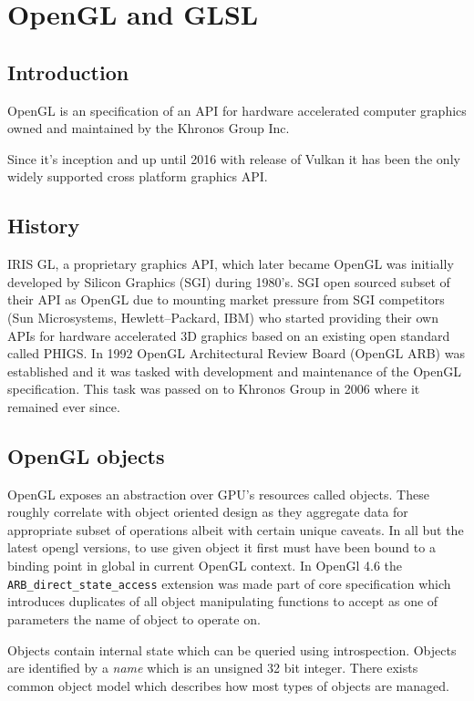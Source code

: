 \chapter{OpenGL and GLSL}

\section{Introduction}

OpenGL is an specification of an API for hardware accelerated computer graphics owned and maintained by the Khronos Group Inc.

Since it's inception  and up until 2016 with release of Vulkan it has been the only widely supported cross platform graphics API.

\section{History}

IRIS GL, a proprietary graphics API, which later became OpenGL was initially developed by Silicon Graphics (SGI) 
during 1980's. SGI open sourced subset of their API as OpenGL due to mounting market pressure from SGI competitors (Sun Microsystems, Hewlett--Packard, IBM) 
who started providing their own APIs for hardware accelerated 3D graphics based on an existing open standard called PHIGS.
In 1992 OpenGL Architectural Review Board (OpenGL ARB) was established and it was tasked with development and maintenance of the OpenGL specification. 
This task was passed on to Khronos Group in 2006 where it remained ever since.

\section{OpenGL objects}

OpenGL exposes an abstraction over GPU's resources called objects.
These roughly correlate with object oriented design as they aggregate data for appropriate subset of operations albeit with certain unique caveats.
In all but the latest opengl versions, to use given object it first must have been bound to a binding point in global in current OpenGL context.
In OpenGl 4.6 the \texttt{ARB\_direct\_state\_access} extension was made part of core specification which introduces duplicates of all object manipulating functions to 
accept as one of parameters the name of object to operate on.

Objects contain internal state which can be queried using introspection. 
Objects are identified by a \textit{name} which is an unsigned 32 bit integer. 
There exists common object model which describes how most types of objects are managed.

